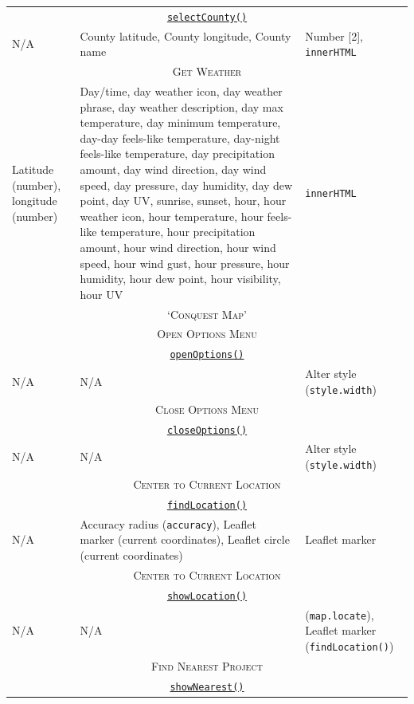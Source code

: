 \documentclass[11pt, english]{article}
\begin{document}
\begin{center}
\begin{longtable}{p{4cm}p{6cm}p{2cm}}
		\multicolumn{3}{c}{\underline{\texttt{selectCounty()}}}\\
		N/A & County latitude, County longitude, County name & Number [2], \texttt{innerHTML}\\
		\hline
		\multicolumn{3}{c}{\textsc{Get Weather}}\\
		\hline
		Latitude (number), longitude (number) & Day/time, day weather icon, day weather phrase, day weather description, day max temperature, day minimum temperature, day-day feels-like temperature, day-night feels-like temperature, day precipitation amount, day wind direction, day wind speed, day pressure, day humidity, day dew point, day UV, sunrise, sunset, hour, hour weather icon, hour temperature, hour feels-like temperature, hour precipitation amount, hour wind direction, hour wind speed, hour wind gust, hour pressure, hour humidity, hour dew point, hour visibility, hour UV & \texttt{innerHTML}\\
		\hline
		\hline
		\multicolumn{3}{c}{\textsc{`Conquest Map'}}\\
		\hline
		\hline
		\multicolumn{3}{c}{\textsc{Open Options Menu}}\\
		\hline
		\multicolumn{3}{c}{\underline{\texttt{openOptions()}}}\\
		N/A & N/A & Alter style (\texttt{style.width})\\
		\hline
		\multicolumn{3}{c}{\textsc{Close Options Menu}}\\
		\hline
		\multicolumn{3}{c}{\underline{\texttt{closeOptions()}}}\\
		N/A & N/A & Alter style (\texttt{style.width})\\
		\hline
		\multicolumn{3}{c}{\textsc{Center to Current Location}}\\
		\hline
		\multicolumn{3}{c}{\underline{\texttt{findLocation()}}}\\
		N/A & Accuracy radius (\texttt{accuracy}), Leaflet marker (current coordinates), Leaflet circle (current coordinates) & Leaflet marker\\
		\hline
		\multicolumn{3}{c}{\textsc{Center to Current Location}}\\
		\hline
		\multicolumn{3}{c}{\underline{\texttt{showLocation()}}}\\
		N/A & N/A & (\texttt{map.locate}), Leaflet marker (\texttt{findLocation()})\\
		\hline
		\multicolumn{3}{c}{\textsc{Find Nearest Project}}\\
		\hline
		\multicolumn{3}{c}{\underline{\texttt{showNearest()}}}\\

\end{longtable}
\end{center}
\end{document}
